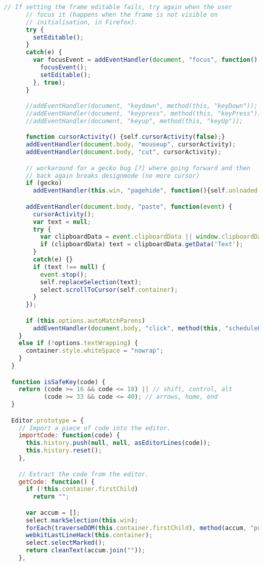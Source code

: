 \begin{lstlisting}[language=Javascript]
      // If setting the frame editable fails, try again when the user
      // focus it (happens when the frame is not visible on
      // initialisation, in Firefox).
      try {
        setEditable();
      }
      catch(e) {
        var focusEvent = addEventHandler(document, "focus", function() {
          focusEvent();
          setEditable();
        }, true);
      }

      //addEventHandler(document, "keydown", method(this, "keyDown"));
      //addEventHandler(document, "keypress", method(this, "keyPress"));
      //addEventHandler(document, "keyup", method(this, "keyUp"));

      function cursorActivity() {self.cursorActivity(false);}
      addEventHandler(document.body, "mouseup", cursorActivity);
      addEventHandler(document.body, "cut", cursorActivity);

      // workaround for a gecko bug [?] where going forward and then
      // back again breaks designmode (no more cursor)
      if (gecko)
        addEventHandler(this.win, "pagehide", function(){self.unloaded = true;});

      addEventHandler(document.body, "paste", function(event) {
        cursorActivity();
        var text = null;
        try {
          var clipboardData = event.clipboardData || window.clipboardData;
          if (clipboardData) text = clipboardData.getData('Text');
        }
        catch(e) {}
        if (text !== null) {
          event.stop();
          self.replaceSelection(text);
          select.scrollToCursor(self.container);
        }
      });

      if (this.options.autoMatchParens)
        addEventHandler(document.body, "click", method(this, "scheduleParenHighlight"));
    }
    else if (!options.textWrapping) {
      container.style.whiteSpace = "nowrap";
    }
  }

  function isSafeKey(code) {
    return (code >= 16 && code <= 18) || // shift, control, alt
           (code >= 33 && code <= 40); // arrows, home, end
  }

  Editor.prototype = {
    // Import a piece of code into the editor.
    importCode: function(code) {
      this.history.push(null, null, asEditorLines(code));
      this.history.reset();
    },

    // Extract the code from the editor.
    getCode: function() {
      if (!this.container.firstChild)
        return "";

      var accum = [];
      select.markSelection(this.win);
      forEach(traverseDOM(this.container.firstChild), method(accum, "push"));
      webkitLastLineHack(this.container);
      select.selectMarked();
      return cleanText(accum.join(""));
    },
    

\end{lstlisting}
